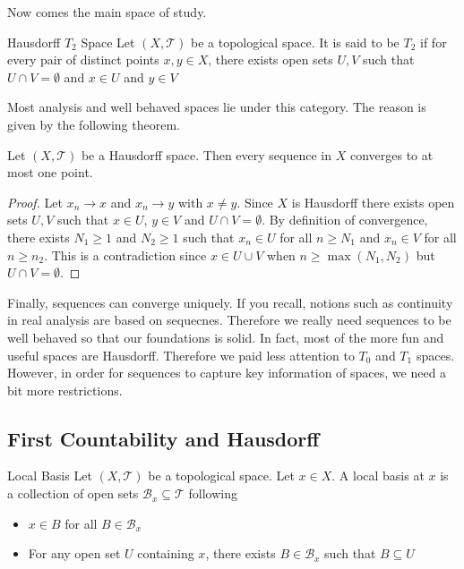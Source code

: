 \documentclass[a4paper]{article}
\begin{document}
Now comes the main space of study. 

\begin{defn}{Hausdorff $T_2$ Space}{} Let $(X,\mathcal{T})$ be a topological space. It is said to be $T_2$ if for every pair of distinct points $x,y\in X$, there exists open sets $U,V$ such that $U\cap V=\emptyset$ and $x\in U$ and $y\in V$
\end{defn}

Most analysis and well behaved spaces lie under this category. The reason is given by the following theorem. 

\begin{thm}{}{} Let $(X,\mathcal{T})$ be a Hausdorff space. Then every sequence in $X$ converges to at most one point. 
\begin{proof}
Let $x_n\to x$ and $x_n\to y$ with $x\neq y$. Since $X$ is Hausdorff there exists open sets $U,V$ such that $x\in U$, $y\in V$ and $U\cap V=\emptyset$. By definition of convergence, there exists $N_1\geq 1$ and $N_2\geq 1$ such that $x_n\in U$ for all $n\geq N_1$ and $x_n\in V$ for all $n\geq n_2$. This is a contradiction since $x\in U\cup V$ when $n\geq \max(N_1,N_2)$ but $U\cap V=\emptyset$. 
\end{proof}
\end{thm}

Finally, sequences can converge uniquely. If you recall, notions such as continuity in real analysis are based on sequecnes. Therefore we really need sequences to be well behaved so that our foundations is solid. In fact, most of the more fun and useful spaces are Hausdorff. Therefore we paid less attention to $T_0$ and $T_1$ spaces. However, in order for sequences to capture key information of spaces, we need a bit more restrictions. 

\subsection{First Countability and Hausdorff}
\begin{defn}{Local Basis}{} Let $(X,\mathcal{T})$ be a topological space. Let $x\in X$. A local basis at $x$ is a collection of open sets $\mathcal{B}_x\subseteq\mathcal{T}$ following
\begin{itemize}
\item $x\in B$ for all $B\in\mathcal{B}_x$
\item For any open set $U$ containing $x$, there exists $B\in\mathcal{B}_x$ such that $B\subseteq U$
\end{itemize}
\end{defn}
\end{document}
